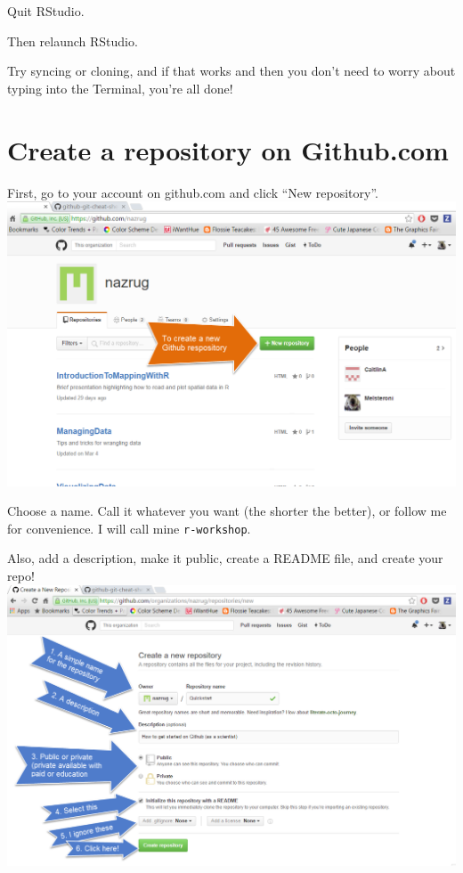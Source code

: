 \documentclass[]{book}
\begin{document}
Quit RStudio.

Then relaunch RStudio.

Try syncing or cloning, and if that works and then you don't need to worry about typing into the Terminal, you're all done!

\hypertarget{create-a-repository-on-github.com}{%
\section{Create a repository on Github.com}\label{create-a-repository-on-github.com}}

First, go to your account on github.com and click ``New repository''.
\includegraphics{img/create_repository.png}

Choose a name. Call it whatever you want (the shorter the better), or follow me for convenience. I will call mine \texttt{r-workshop}.

Also, add a description, make it public, create a README file, and create your repo!
\includegraphics{img/create_repository_2.png}
\end{document}
